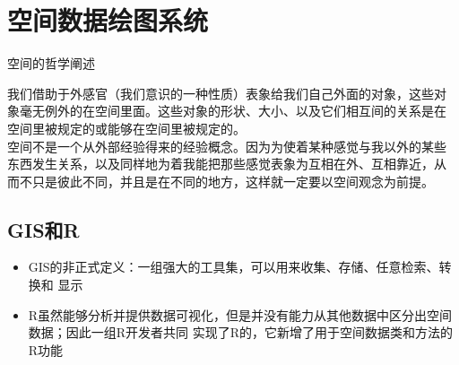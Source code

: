 
\section{空间数据绘图系统}

\begin{frame}[c]{空间的哲学阐述}{}
      \begin{ornamentblock}%
\hspace*{2em}我们借助于外感官（我们意识的一种性质）表象给我们自己外面的对象，这些对
象毫无例外的在空间里面。这些对象的形状、大小、以及它们相互间的关系是在
空间里被规定的或能够在空间里被规定的。\\
\hspace*{2em}空间不是一个从外部经验得来的经验概念。因为为使着某种感觉与我以外的某些
东西发生关系，以及同样地为着我能把那些感觉表象为互相在外、互相靠近，从
而不只是彼此不同，并且是在不同的地方，这样就一定要以空间观念为前提。\\
      \end{ornamentblock}
\end{frame}

\subsection{GIS和R}
\begin{frame}[t]{\subsecname}{}
\begin{itemize}
\item GIS的非正式定义\footnotemark[1]：一组强大的工具集，可以用来收集、存储、任意检索、转换和
显示
\item R虽然能够分析并提供数据可视化，但是并没有能力从其他数据中区分出空间数据；因此一组R开发者共同
实现了R的\footnotemark[2]，它新增了用于空间数据类和方法的R功能
\end{itemize}


\end{frame}

